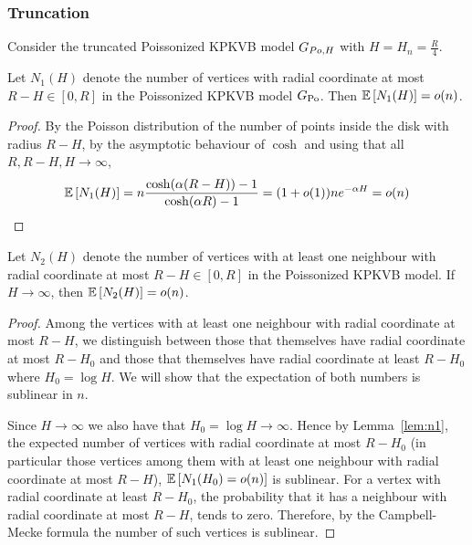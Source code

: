 \subsubsection{Truncation}
Consider the truncated Poissonized KPKVB model $G_{Po,H}$ with $H =H_n= \frac{R}{4}$.
\begin{lemma}\label{lem:n1}
Let $N_1(H)$ denote the number of vertices with radial coordinate at most $R-H \in [0,R]$ in the Poissonized KPKVB model $G_{{\mathrm{Po}}}$. Then $\mathbb{E}\left[N_1(H)\right] = o(n)$.%
\end{lemma}
\begin{proof}
By the Poisson distribution of the number of points inside the disk with radius $R-H$, by the asymptotic behaviour of $\cosh$ and using that all $R, R-H, H \rightarrow \infty$,
\begin{align*}
\mathbb{E}\left[N_1(H)\right] = n \frac{\cosh(\alpha(R-H))-1}{\cosh(\alpha R) -1} = (1+o(1)) n e^{-\alpha H} = o(n)
\end{align*}
\end{proof}
\begin{lemma}\label{lem:n2}
Let $N_2(H)$ denote the number of vertices with at least one neighbour with radial coordinate at most $R-H \in [0,R]$ in the Poissonized KPKVB model. If $H \rightarrow \infty$, then $\mathbb{E}\left[N_2(H)\right] = o(n)$.
\end{lemma}
\begin{proof}
Among the vertices with at least one neighbour with radial coordinate at most $R-H$, we distinguish between those that themselves have radial coordinate at most $R-H_0$ and those that themselves have radial coordinate at least $R-H_0$ where $H_0 = \log H$. We will show that the expectation of both numbers is sublinear in $n$.

Since $H \rightarrow \infty$ we also have that $H_0 = \log H \rightarrow \infty$. Hence by Lemma~\ref{lem:n1}, the expected number of vertices with radial coordinate at most $R-H_0$ (in particular those vertices among them with at least one neighbour with radial coordinate at most $R-H$), $\mathbb{E}\left[ N_1(H_0) = o(n)\right]$ is sublinear. For a vertex with radial coordinate at least $R-H_0$, the probability that it has a neighbour with radial coordinate at most $R-H$, tends to zero. Therefore, by the Campbell-Mecke formula the number of such vertices is sublinear.
\end{proof}

